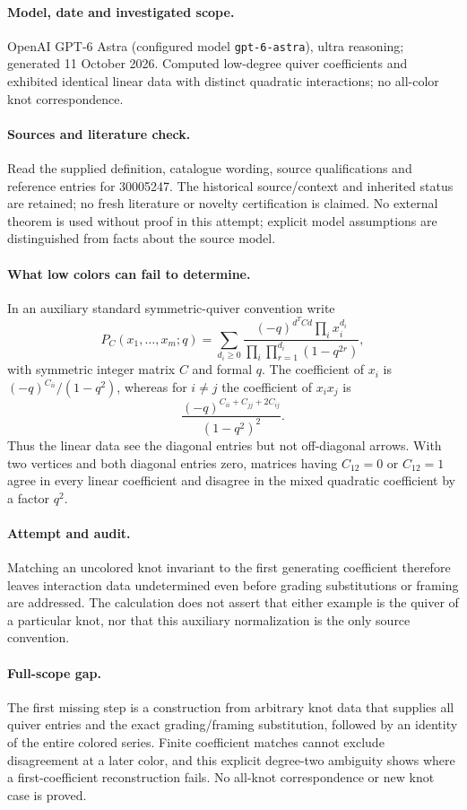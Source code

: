 \documentclass[11pt]{article}
\begin{document}
\paragraph{Model, date and investigated scope.}
OpenAI GPT-6 Astra (configured model \texttt{gpt-6-astra}), ultra reasoning; generated 11 October 2026. Computed low-degree quiver coefficients and exhibited identical linear data with distinct quadratic interactions; no all-color knot correspondence.

\paragraph{Sources and literature check.}
Read the supplied definition, catalogue wording, source qualifications and reference entries for 30005247. The historical source/context and inherited status are retained; no fresh literature or novelty certification is claimed. No external theorem is used without proof in this attempt; explicit model assumptions are distinguished from facts about the source model.

\paragraph{What low colors can fail to determine.} In an auxiliary standard symmetric-quiver convention write
\[
 P_C(x_1,\ldots,x_m;q)=\sum_{d_i\ge0}
 \frac{(-q)^{d^TCd}\prod_i x_i^{d_i}}{\prod_i\prod_{r=1}^{d_i}(1-q^{2r})},
\]
with symmetric integer matrix \(C\) and formal \(q\). The coefficient of \(x_i\) is \((-q)^{C_{ii}}/(1-q^2)\), whereas for \(i\ne j\) the coefficient of \(x_ix_j\) is
\[
 \frac{(-q)^{C_{ii}+C_{jj}+2C_{ij}}}{(1-q^2)^2}.
\]
Thus the linear data see the diagonal entries but not off-diagonal arrows. With two vertices and both diagonal entries zero, matrices having \(C_{12}=0\) or \(C_{12}=1\) agree in every linear coefficient and disagree in the mixed quadratic coefficient by a factor \(q^2\).
\paragraph{Attempt and audit.} Matching an uncolored knot invariant to the first generating coefficient therefore leaves interaction data undetermined even before grading substitutions or framing are addressed. The calculation does not assert that either example is the quiver of a particular knot, nor that this auxiliary normalization is the only source convention.
\paragraph{Full-scope gap.} The first missing step is a construction from arbitrary knot data that supplies all quiver entries and the exact grading/framing substitution, followed by an identity of the entire colored series. Finite coefficient matches cannot exclude disagreement at a later color, and this explicit degree-two ambiguity shows where a first-coefficient reconstruction fails. No all-knot correspondence or new knot case is proved.
\end{document}

